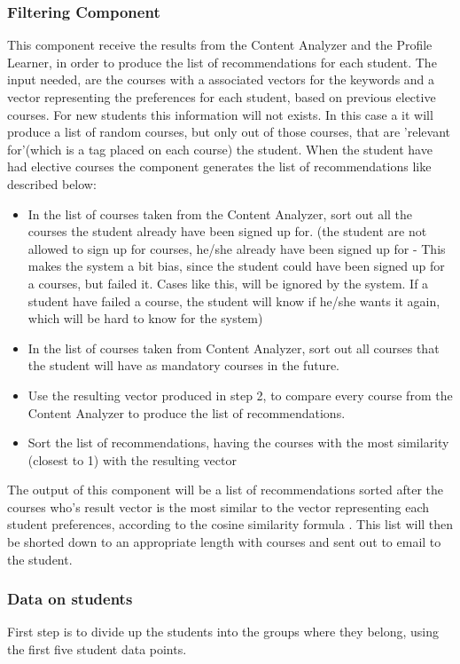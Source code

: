 \subsubsection{Filtering Component}
This component receive the results from the Content Analyzer and the Profile Learner, in order to produce the list of recommendations for each student. The input needed, are the courses with a associated vectors for the keywords and a vector representing the preferences for each student, based on previous elective courses. For new students this information will not exists. In this case a it will produce a list of random courses, but only out of those courses, that are 'relevant for'(which is a tag placed on each course) the student. When the student have had elective courses the component generates the list of recommendations like described below:
\begin{itemize}
	\item In the list of courses taken from the Content Analyzer, sort out all the courses the student already have been signed up for. (the student are not allowed to sign up for courses, he/she already have been signed up for - This makes the system a bit bias, since the student could have been signed up for a courses, but failed it. Cases like this, will be ignored by the system. If a student have failed a course, the student will know if he/she wants it again, which will be hard to know for the system)
	\item In the list of courses taken from Content Analyzer, sort out all courses that the student will have as mandatory courses in the future.
	\item Use the resulting vector produced in step 2, to compare every course from the Content Analyzer to produce the list of recommendations.
	\item Sort the list of recommendations, having the courses with the most similarity (closest to 1) with the resulting vector 
\end{itemize}
The output of this component will be a list of recommendations sorted after the courses who's result vector is the most similar to the vector representing each student preferences, according to the cosine similarity formula . This list will then be shorted down to an appropriate length with courses and sent out to email to the student. 

\subsubsection{Data on students}
First step is to divide up the students into the groups where they belong, using the first five student data points.

